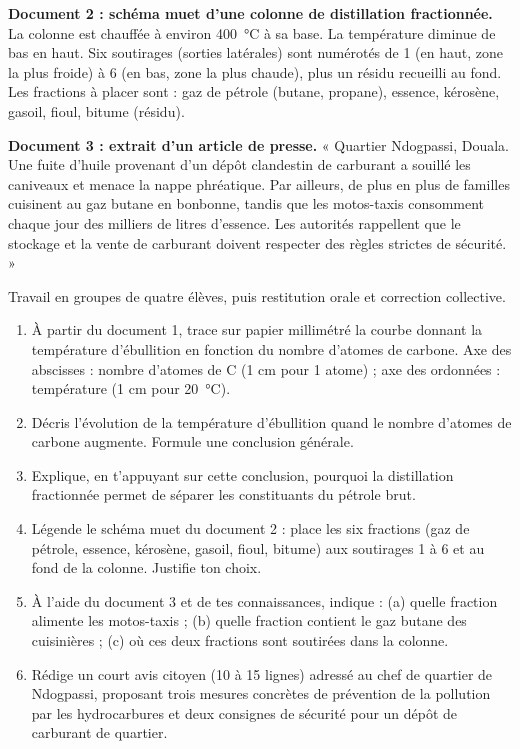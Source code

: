 \documentclass[11pt]{article}
\newcounter{popsec}
\newcounter{popsub}
\newcommand{\courssub}[1]{%
  \stepcounter{popsub}%
  \par\vspace{9pt}\noindent{\popxbold\fontsize{11.5}{13}\selectfont\color{popink}{\color{poporange}\thepopsec.\thepopsub}\hspace{6pt}#1}\par\nopagebreak\vspace{4pt}
}
\begin{document}
\textbf{Document 2 : schéma muet d'une colonne de distillation fractionnée.} La colonne est chauffée à environ \SI{400}{\celsius} à sa base. La température diminue de bas en haut. Six soutirages (sorties latérales) sont numérotés de 1 (en haut, zone la plus froide) à 6 (en bas, zone la plus chaude), plus un résidu recueilli au fond. Les fractions à placer sont : gaz de pétrole (butane, propane), essence, kérosène, gasoil, fioul, bitume (résidu).

\textbf{Document 3 : extrait d'un article de presse.} « Quartier Ndogpassi, Douala. Une fuite d'huile provenant d'un dépôt clandestin de carburant a souillé les caniveaux et menace la nappe phréatique. Par ailleurs, de plus en plus de familles cuisinent au gaz butane en bonbonne, tandis que les motos-taxis consomment chaque jour des milliers de litres d'essence. Les autorités rappellent que le stockage et la vente de carburant doivent respecter des règles strictes de sécurité. »

\courssub{Consignes}

Travail en groupes de quatre élèves, puis restitution orale et correction collective.

\begin{enumerate}
\item À partir du document 1, trace sur papier millimétré la courbe donnant la température d'ébullition en fonction du nombre d'atomes de carbone. Axe des abscisses : nombre d'atomes de C (1 cm pour 1 atome) ; axe des ordonnées : température (1 cm pour \SI{20}{\celsius}).
\item Décris l'évolution de la température d'ébullition quand le nombre d'atomes de carbone augmente. Formule une conclusion générale.
\item Explique, en t'appuyant sur cette conclusion, pourquoi la distillation fractionnée permet de séparer les constituants du pétrole brut.
\item Légende le schéma muet du document 2 : place les six fractions (gaz de pétrole, essence, kérosène, gasoil, fioul, bitume) aux soutirages 1 à 6 et au fond de la colonne. Justifie ton choix.
\item À l'aide du document 3 et de tes connaissances, indique : (a) quelle fraction alimente les motos-taxis ; (b) quelle fraction contient le gaz butane des cuisinières ; (c) où ces deux fractions sont soutirées dans la colonne.
\item Rédige un court avis citoyen (10 à 15 lignes) adressé au chef de quartier de Ndogpassi, proposant trois mesures concrètes de prévention de la pollution par les hydrocarbures et deux consignes de sécurité pour un dépôt de carburant de quartier.
\end{enumerate}
\end{document}
